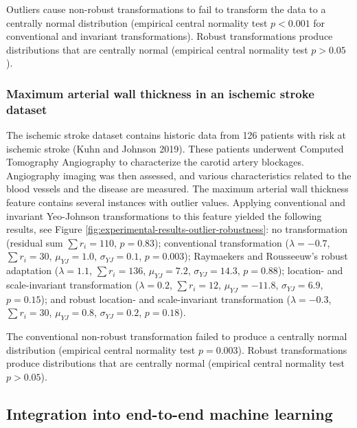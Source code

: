 \documentclass[
  a4paper,
]{article}
\begin{document}
Outliers cause non-robust transformations to fail to transform the data
to a centrally normal distribution (empirical central normality test
\(p < 0.001\) for conventional and invariant transformations). Robust
transformations produce distributions that are centrally normal
(empirical central normality test \(p > 0.05\)).

\subsubsection{Maximum arterial wall thickness in an ischemic stroke
dataset}\label{maximum-arterial-wall-thickness-in-an-ischemic-stroke-dataset}

The ischemic stroke dataset contains historic data from 126 patients
with risk at ischemic stroke (Kuhn and Johnson 2019). These patients
underwent Computed Tomography Angiography to characterize the carotid
artery blockages. Angiography imaging was then assessed, and various
characteristics related to the blood vessels and the disease are
measured. The maximum arterial wall thickness feature contains several
instances with outlier values. Applying conventional and invariant
Yeo-Johnson transformations to this feature yielded the following
results, see Figure \ref{fig:experimental-results-outlier-robustness}:
no transformation (residual sum \(\sum r_i = 110\), \(p=0.83\));
conventional transformation (\(\lambda = -0.7\), \(\sum r_i = 30\),
\(\mu_{YJ} = 1.0\), \(\sigma_{YJ} = 0.1\), \(p=0.003\)); Raymaekers and
Rousseeuw's robust adaptation (\(\lambda = 1.1\), \(\sum r_i = 136\),
\(\mu_{YJ} = 7.2\), \(\sigma_{YJ} = 14.3\), \(p=0.88\)); location- and
scale-invariant transformation (\(\lambda = 0.2\), \(\sum r_i = 12\),
\(\mu_{YJ} = -11.8\), \(\sigma_{YJ} = 6.9\), \(p=0.15\)); and robust
location- and scale-invariant transformation (\(\lambda = -0.3\),
\(\sum r_i = 30\), \(\mu_{YJ} = 0.8\), \(\sigma_{YJ} = 0.2\),
\(p=0.18\)).

The conventional non-robust transformation failed to produce a centrally
normal distribution (empirical central normality test \(p=0.003\)).
Robust transformations produce distributions that are centrally normal
(empirical central normality test \(p > 0.05\)).

\subsection{Integration into end-to-end machine
learning}\label{integration-into-end-to-end-machine-learning}
\end{document}
